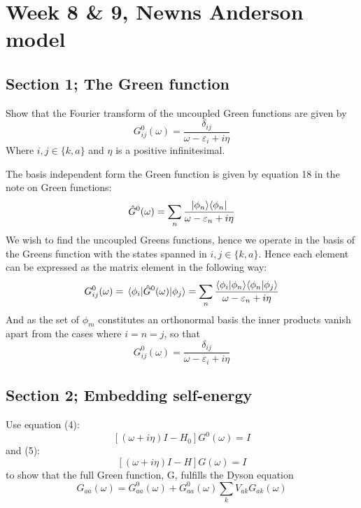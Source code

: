 \section{Week 8 \& 9, Newns Anderson model}
\subsection{Section 1; The Green function}
\begin{exercise}
Show that the Fourier transform of the uncoupled Green functions are given by 
\begin{equation}\label{eq:uncoupledGreen}
    G_{ij}^0(\omega) = \frac{\delta_{ij}}{\omega - \varepsilon_i + i \eta}
\end{equation}
Where $i,j \in \{k,a\}$ and $\eta$ is a positive infinitesimal.
\end{exercise}

\begin{solution}
The basis independent form the Green function is given by equation 18 in the note on Green functions:
\begin{equation}
   \hat{G}^0(\omega) = \sum_n \frac{|\phi_n\rangle \langle \phi_n |}{\omega - \varepsilon_n + i \eta}
\end{equation}
We wish to find the uncoupled Greens functions, hence we operate in the basis of the Greens function with the states spanned in $i,j \in \{k,a\}$. Hence each element can be expressed as the matrix element in the following way:
\begin{equation}
     G_{ij}^0(\omega) = \mel{\phi_i}{\hat{G}^0(\omega)}{\phi_j} = \sum_n \frac{\langle \phi_i | \phi_n \rangle \langle \phi_n | \phi_j \rangle}{\omega - \varepsilon_n + i \eta}
\end{equation}
And as the set of $\phi_m$ constitutes an orthonormal basis the inner products vanish apart from the cases where $i=n=j$, so that
\begin{equation}
    G_{ij}^0(\omega) = \frac{\delta_{ij}}{\omega - \varepsilon_i + i \eta}
\end{equation}
\end{solution}
\subsection{Section 2; Embedding self-energy}
\begin{exercise}
Use equation (4):
\begin{equation}
    \left[(\omega + i \eta)I - H_0 \right]G^0(\omega) = I
    \label{eq:NonInt}
\end{equation}
and (5):
\begin{equation}
        \left[(\omega + i \eta)I - H \right]G(\omega) = I
        \label{eq:WithInt}
\end{equation}
to show that the full Green function, G, fulfills the Dyson equation
\begin{equation}
    G_{aa}(\omega) = G_{aa}^0(\omega) + G_{aa}^0(\omega) \sum_k V_{ak} G_{ak}(\omega)
\end{equation}
\end{exercise}

